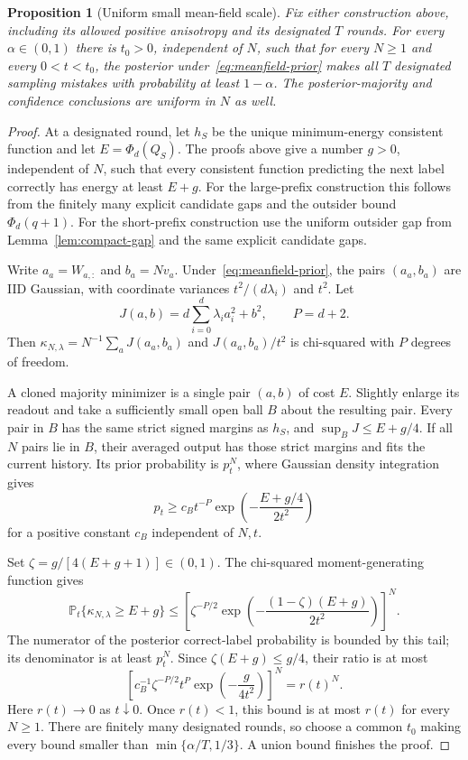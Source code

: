 \documentclass[11pt]{article}
\newtheorem{proposition}[theorem]{Proposition}
\newcommand{\Pp}{\mathbb P}
\begin{document}
\begin{proposition}[Uniform small mean-field scale]\label{prop:uniform-scale}
Fix either construction above, including its allowed positive
anisotropy and its designated $T$ rounds. For every $\alpha\in(0,1)$
there is $t_0>0$, independent of $N$, such that for every $N\ge1$
and every $0<t<t_0$, the posterior under~\eqref{eq:meanfield-prior}
makes all $T$ designated sampling mistakes with probability at least
$1-\alpha$. The posterior-majority and confidence conclusions are
uniform in $N$ as well.
\end{proposition}
\begin{proof}
At a designated round, let $h_S$ be the unique minimum-energy
consistent function and let $E=\Phi_d(Q_S)$. The proofs above give a
number $g>0$, independent of $N$, such that every consistent function
predicting the next label correctly has energy at least $E+g$.
For the large-prefix construction this follows from the finitely
many explicit candidate gaps and the outsider bound $\Phi_d(q+1)$.
For the short-prefix construction use the uniform outsider gap from
Lemma~\ref{lem:compact-gap} and the same explicit candidate gaps.

Write $a_a=W_{a,:}$ and $b_a=Nv_a$. Under~\eqref{eq:meanfield-prior},
the pairs $(a_a,b_a)$ are IID Gaussian, with coordinate variances
$t^2/(d\lambda_i)$ and $t^2$. Let
\[
 J(a,b)=d\sum_{i=0}^d\lambda_i a_i^2+b^2,\qquad P=d+2.
\]
Then $\kappa_{N,\lambda}=N^{-1}\sum_aJ(a_a,b_a)$ and
$J(a_a,b_a)/t^2$ is chi-squared with $P$ degrees of freedom.

A cloned majority minimizer is a single pair $(a,b)$ of cost $E$.
Slightly enlarge its readout and take a sufficiently small open ball
$B$ about the resulting pair. Every pair in $B$ has the same strict
signed margins as $h_S$, and $\sup_B J\le E+g/4$.
If all $N$ pairs lie in $B$, their averaged output has those strict
margins and fits the current history. Its prior probability is
$p_t^N$, where Gaussian density integration gives
\[
 p_t\ge c_B t^{-P}\exp\!\left(-\frac{E+g/4}{2t^2}\right)
\]
for a positive constant $c_B$ independent of $N,t$.

Set $\zeta=g/[4(E+g+1)]\in(0,1)$. The chi-squared moment-generating
function gives
\[
 \Pp_t\{\kappa_{N,\lambda}\ge E+g\}
 \le\left[\zeta^{-P/2}
       \exp\!\left(-\frac{(1-\zeta)(E+g)}{2t^2}\right)\right]^N.
\]
The numerator of the posterior correct-label probability is bounded
by this tail; its denominator is at least $p_t^N$. Since
$\zeta(E+g)\le g/4$, their ratio is at most
\[
 \left[c_B^{-1}\zeta^{-P/2}t^P
              \exp\!\left(-\frac{g}{4t^2}\right)\right]^N
 =r(t)^N.
\]
Here $r(t)\to0$ as $t\downarrow0$. Once $r(t)<1$, this bound is at
most $r(t)$ for every $N\ge1$. There are finitely many designated
rounds, so choose a common $t_0$ making every bound smaller than
$\min\{\alpha/T,1/3\}$. A union bound finishes the proof.
\end{proof}
\end{document}
